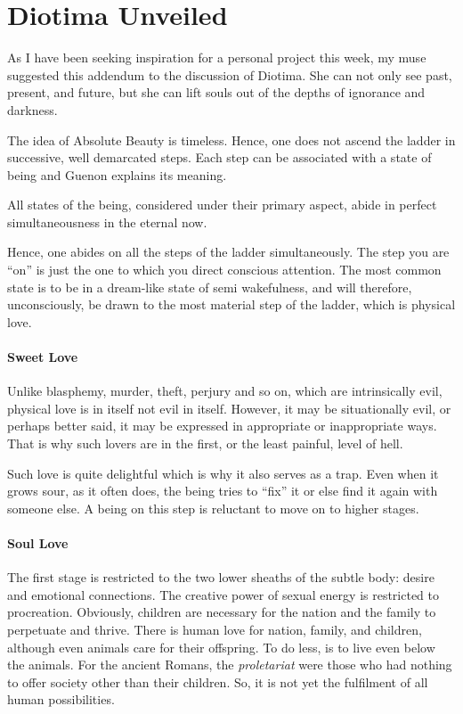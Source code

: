 \section{Diotima Unveiled}

As I have been seeking inspiration for a personal project this week, my muse suggested this addendum to the discussion of Diotima. She can not only see past, present, and future, but she can lift souls out of the depths of ignorance and darkness.

The idea of Absolute Beauty is timeless. Hence, one does not ascend the ladder in successive, well demarcated steps. Each step can be associated with a state of being and Guenon explains its meaning.

\begin{quotex}
All states of the being, considered under their primary aspect, abide in perfect simultaneousness in the eternal now. 

\end{quotex}
Hence, one abides on all the steps of the ladder simultaneously. The step you are “on” is just the one to which you direct conscious attention. The most common state is to be in a dream-like state of semi wakefulness, and will therefore, unconsciously, be drawn to the most material step of the ladder, which is physical love.

\paragraph{Sweet Love}
Unlike blasphemy, murder, theft, perjury and so on, which are intrinsically evil, physical love is in itself not evil in itself. However, it may be situationally evil, or perhaps better said, it may be expressed in appropriate or inappropriate ways. That is why such lovers are in the first, or the least painful, level of hell.

Such love is quite delightful which is why it also serves as a trap. Even when it grows sour, as it often does, the being tries to “fix” it or else find it again with someone else. A being on this step is reluctant to move on to higher stages.

\paragraph{Soul Love}
The first stage is restricted to the two lower sheaths of the subtle body: desire and emotional connections. The creative power of sexual energy is restricted to procreation. Obviously, children are necessary for the nation and the family to perpetuate and thrive. There is human love for nation, family, and children, although even animals care for their offspring. To do less, is to live even below the animals. For the ancient Romans, the \emph{proletariat} were those who had nothing to offer society other than their children. So, it is not yet the fulfilment of all human possibilities.

